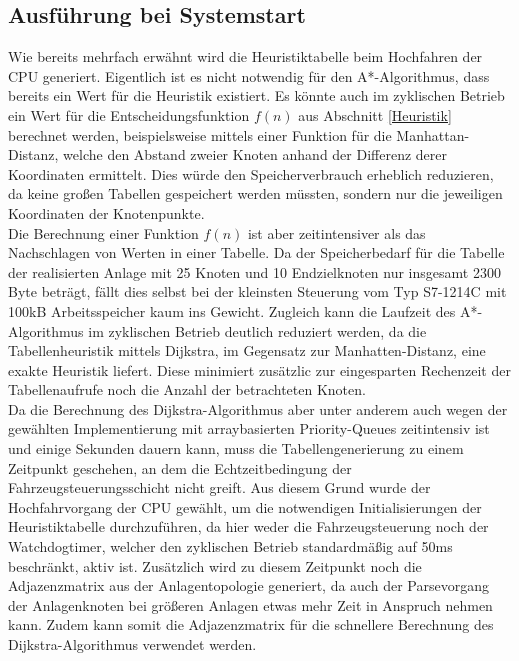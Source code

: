 	
		\subsection{Ausführung bei Systemstart}
			
			Wie bereits mehrfach erwähnt wird die Heuristiktabelle beim Hochfahren der CPU generiert. Eigentlich ist es nicht notwendig für den A*-Algorithmus, dass bereits ein Wert für die Heuristik existiert. Es könnte auch im zyklischen Betrieb ein Wert für die Entscheidungsfunktion $f(n)$ aus Abschnitt \ref{Heuristik} berechnet werden, beispielsweise mittels einer Funktion für die Manhattan-Distanz, welche den Abstand zweier Knoten anhand der Differenz derer Koordinaten ermittelt. Dies würde den Speicherverbrauch erheblich reduzieren, da keine großen Tabellen gespeichert werden müssten, sondern nur die jeweiligen Koordinaten der Knotenpunkte.
			\\[4pt]
			Die Berechnung einer Funktion $f(n)$ ist aber zeitintensiver als das Nachschlagen von Werten in einer Tabelle. Da der Speicherbedarf für die Tabelle der realisierten Anlage mit 25 Knoten und 10 Endzielknoten nur insgesamt 2300 Byte beträgt, fällt dies selbst bei der kleinsten Steuerung vom Typ S7-1214C mit 100kB Arbeitsspeicher kaum ins Gewicht. Zugleich kann die Laufzeit des A*-Algorithmus im zyklischen Betrieb deutlich reduziert werden, da die Tabellenheuristik mittels Dijkstra, im Gegensatz zur Manhatten-Distanz, eine exakte Heuristik liefert. Diese minimiert zusätzlic zur eingesparten Rechenzeit der Tabellenaufrufe noch die Anzahl der betrachteten Knoten.
			\\[4pt]
			Da die Berechnung des Dijkstra-Algorithmus aber unter anderem auch wegen der gewählten Implementierung mit arraybasierten Priority-Queues zeitintensiv ist \cite{BorisCherkassky1993} und einige Sekunden dauern kann, muss die Tabellengenerierung zu einem Zeitpunkt geschehen, an dem die Echtzeitbedingung der Fahrzeugsteuerungsschicht nicht greift. Aus diesem Grund wurde der Hochfahrvorgang der CPU gewählt, um die notwendigen Initialisierungen der Heuristiktabelle durchzuführen, da hier weder die Fahrzeugsteuerung noch der Watchdogtimer, welcher den zyklischen Betrieb standardmäßig auf 50ms beschränkt, aktiv ist. Zusätzlich wird zu diesem Zeitpunkt noch die Adjazenzmatrix aus der Anlagentopologie generiert, da auch der Parsevorgang der Anlagenknoten bei größeren Anlagen etwas mehr Zeit in Anspruch nehmen kann. Zudem kann somit die Adjazenzmatrix für die schnellere Berechnung des Dijkstra-Algorithmus verwendet werden.
				
